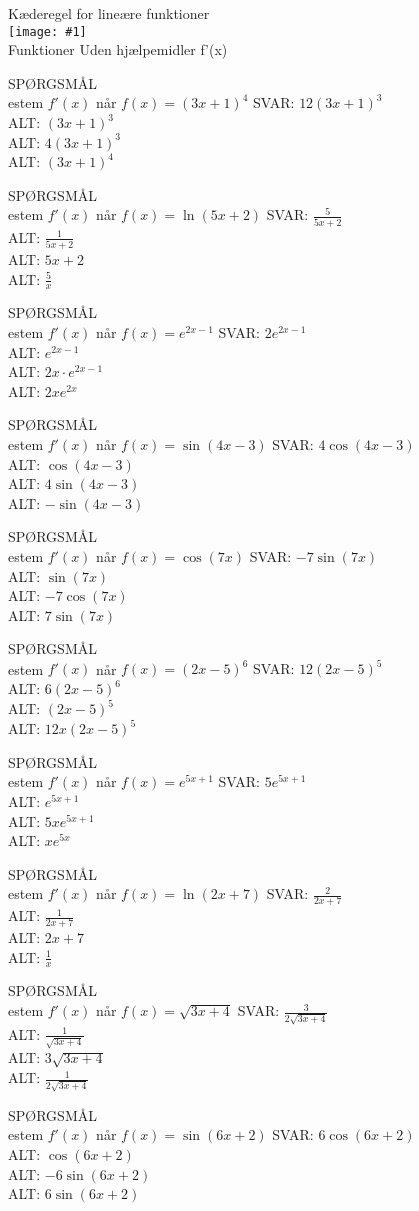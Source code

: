 \documentclass[]{article}
\newcounter{spgcounter}
\newenvironment{question}[2]{\addtocounter{spgcounter}{1} SPØRGSMÅL \thespgcounter\\}{\hspace{50px}}
\newcommand{\name}[1]{{\huge #1}\\}
\newcommand{\tag}[1]{#1}
\newcommand{\cover}[1]{\texttt{[image: \#1]}\\}
\newcommand{\answer}[1]{{\color{green} SVAR: #1}\\}
\newcommand{\alt}[1]{{\color{red} ALT: #1}\\}
\begin{document}
\name{Kæderegel for lineære funktioner}
\cover{lineærekæderegel.png}
\tag{Funktioner}
\tag{Uden hjælpemidler}
\tag{f'(x)}

\begin{question}{multi}
    Bestem $f'(x)$ når $f(x)=(3x + 1)^4$
    \answer{$12(3x+1)^3$}
    \alt{$(3x+1)^3$}
    \alt{$4(3x+1)^3$}
    \alt{$(3x+1)^4$}
    \end{question}
    
    \begin{question}{multi}
    Bestem $f'(x)$ når $f(x)=\ln(5x + 2)$
    \answer{$\frac{5}{5x+2}$}
    \alt{$\frac{1}{5x+2}$}
    \alt{$5x + 2$}
    \alt{$\frac{5}{x}$}
    \end{question}
    
    \begin{question}{multi}
    Bestem $f'(x)$ når $f(x)=e^{2x - 1}$
    \answer{$2e^{2x-1}$}
    \alt{$e^{2x-1}$}
    \alt{$2x \cdot e^{2x-1}$}
    \alt{$2xe^{2x}$}
    \end{question}
    
    \begin{question}{multi}
    Bestem $f'(x)$ når $f(x)=\sin(4x - 3)$
    \answer{$4\cos(4x - 3)$}
    \alt{$\cos(4x - 3)$}
    \alt{$4\sin(4x - 3)$}
    \alt{$-\sin(4x-3)$}
    \end{question}
    
    \begin{question}{multi}
    Bestem $f'(x)$ når $f(x)=\cos(7x)$
    \answer{$-7\sin(7x)$}
    \alt{$\sin(7x)$}
    \alt{$-7\cos(7x)$}
    \alt{$7\sin(7x)$}
    \end{question}
    
    \begin{question}{multi}
    Bestem $f'(x)$ når $f(x)=(2x-5)^6$
    \answer{$12(2x-5)^5$}
    \alt{$6(2x-5)^6$}
    \alt{$(2x-5)^5$}
    \alt{$12x(2x-5)^5$}
    \end{question}
    
    \begin{question}{multi}
    Bestem $f'(x)$ når $f(x)=e^{5x+1}$
    \answer{$5e^{5x+1}$}
    \alt{$e^{5x+1}$}
    \alt{$5xe^{5x+1}$}
    \alt{$x e^{5x}$}
    \end{question}
    
    \begin{question}{multi}
    Bestem $f'(x)$ når $f(x)=\ln(2x+7)$
    \answer{$\frac{2}{2x+7}$}
    \alt{$\frac{1}{2x+7}$}
    \alt{$2x+7$}
    \alt{$\frac{1}{x}$}
    \end{question}
    
    \begin{question}{multi}
    Bestem $f'(x)$ når $f(x)=\sqrt{3x+4}$
    \answer{$\frac{3}{2\sqrt{3x+4}}$}
    \alt{$\frac{1}{\sqrt{3x+4}}$}
    \alt{$3\sqrt{3x+4}$}
    \alt{$\frac{1}{2\sqrt{3x+4}}$}
    \end{question}
    
    \begin{question}{multi}
    Bestem $f'(x)$ når $f(x)=\sin(6x+2)$
    \answer{$6\cos(6x+2)$}
    \alt{$\cos(6x+2)$}
    \alt{$-6\sin(6x+2)$}
    \alt{$6\sin(6x+2)$}
\end{question}
\end{document}
